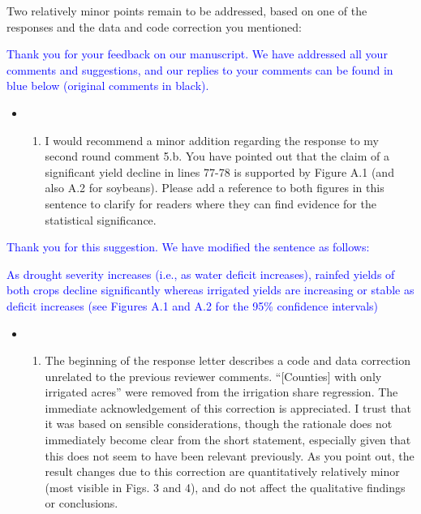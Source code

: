\documentclass[
]{article}
\providecommand{\tightlist}{%
  \setlength{\itemsep}{0pt}\setlength{\parskip}{0pt}}
\begin{document}
Two relatively minor points remain to be addressed, based on one of the
responses and the data and code correction you mentioned:

\textcolor{blue}{Thank you for your feedback on our manuscript. We have addressed all your comments and suggestions, and our replies to your comments can be found in blue below (original comments in black).}

\begin{itemize}
\item
  \begin{enumerate}
  \def\labelenumi{(\arabic{enumi})}
  \tightlist
  \item
    I would recommend a minor addition regarding the response to my
    second round comment 5.b. You have pointed out that the claim of a
    significant yield decline in lines 77-78 is supported by Figure A.1
    (and also A.2 for soybeans). Please add a reference to both figures
    in this sentence to clarify for readers where they can find evidence
    for the statistical significance.
  \end{enumerate}
\end{itemize}

\textcolor{blue}{Thank you for this suggestion. We have modified the sentence as follows:}

\textcolor{blue}{As drought severity increases (i.e., as water deficit increases), rainfed yields of both crops decline significantly whereas irrigated yields are increasing or stable as deficit increases (see Figures A.1 and A.2 for the 95\% confidence intervals)}

\begin{itemize}
\item
  \begin{enumerate}
  \def\labelenumi{(\arabic{enumi})}
  \setcounter{enumi}{1}
  \tightlist
  \item
    The beginning of the response letter describes a code and data
    correction unrelated to the previous reviewer comments.
    ``{[}Counties{]} with only irrigated acres'' were removed from the
    irrigation share regression. The immediate acknowledgement of this
    correction is appreciated. I trust that it was based on sensible
    considerations, though the rationale does not immediately become
    clear from the short statement, especially given that this does not
    seem to have been relevant previously. As you point out, the result
    changes due to this correction are quantitatively relatively minor
    (most visible in Figs. 3 and 4), and do not affect the qualitative
    findings or conclusions.
  \end{enumerate}
\end{itemize}
\end{document}
